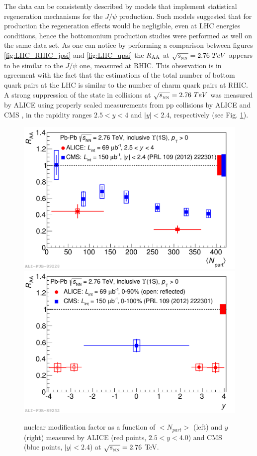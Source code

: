 The data can be consistently described by models that implement statistical regeneration mechanisms for the $J/\psi$ production.
Such models suggested that for \upsis production the regeneration effects would be negligible, even at LHC energies conditions, hence the bottomonium production studies were performed as well on the same data set.
As one can notice by performing a comparison between figures \ref{fig:LHC_RHIC_jpsi} and \ref{fig:LHC_upsi} the \upsi $R_{\rm{AA}}$ at $\sqrt{s_{_{\rm NN}}}=2.76\ TeV$ appears to be similar to the $J/\psi$ one, measured at RHIC.
This observation is in agreement with the fact that the estimations of the total number of bottom quark pairs at the LHC is similar to the number of charm quark pairs at RHIC.
A strong suppression of the \upsis state in \pbpb collisions at $\sqrt{s_{_{\rm NN}}}=2.76\ TeV$ was measured by ALICE using properly scaled measurements from pp collisions by ALICE \cite{Abelev:2014nua} and CMS \cite{Chatrchyan:2012lxa,Khachatryan:2016xxp}, in the rapidity ranges $2.5<y<4$ and $|y|<2.4$, respectively (see Fig. \ref{fig:ALICE_CMS_upsi}). 

\begin{figure}[!t]
\begin{center}
\includegraphics[width=0.47\linewidth]{Chapters/Analysis/Figs/2014-Nov-05-Raa_CMS_centr.pdf}
\includegraphics[width=0.47\linewidth]{Chapters/Analysis/Figs/2014-Nov-05-Raa_CMS_rap.pdf}
\caption{\upsis nuclear modification factor as a function of $<N_{part}>$ (left) and $y$ (right) measured by ALICE (red points, $2.5<y<4.0$) and CMS (blue points, $|y|<2.4$) at $\sqrt{s_{_{\rm NN}}}=2.76$ \rm{TeV}.}
\label{fig:ALICE_CMS_upsi}
\end{center}
\end{figure}

